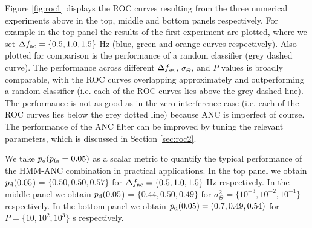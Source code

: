 \documentclass[pra,superscriptaddress,reprint,amsmath,amssymb,nofootinbib]{revtex4-2}
\begin{document}
Figure \ref{fig:roc1} displays the ROC curves resulting from the three numerical experiments above in the top, middle and bottom panels respectively. For example in the top panel the results of the first experiment are plotted, where we set  $\Delta f_{\rm ac} = \{0.5, 1.0, 1.5\}$ Hz (blue, green and orange curves respectively). Also plotted for comparison is the performance of a random classifier (grey dashed curve). The performance across different $\Delta f_{\rm ac}$, $\sigma_\Theta$, and $P$ values is broadly comparable, with the ROC curves overlapping approximately and outperforming a random classifier (i.e. each of the ROC curves lies above the grey dashed line). The performance is not as good as in the zero interference case (i.e. each of the ROC curves lies below the grey dotted line) because ANC is imperfect of course. The performance of the ANC filter can be improved by tuning the relevant parameters, which is discussed in Section \ref{sec:roc2}. \newline 


We take $p_{d}(p_{\rm fa} =0.05)$ as a scalar metric to quantify the typical performance of the HMM-ANC combination in practical applications. In the top panel we obtain $p_{\rm d}(0.05$) = $ \{0.50, 0.50, 0.57 \}$ for $\Delta f_{\rm ac} =  \{0.5, 1.0, 1.5\}$ Hz respectively. In the middle panel we obtain $p_{\rm d}(0.05$) = $ \{0.44,0.50,0.49 \}$ for $\sigma_{\Theta}^2 =  \{ 10^{-3}, 10^{-2}, 10^{-1}\}$ respectively. In the bottom panel we obtain $p_{\rm d}(0.05) = (0.7,0.49,0.54)$ for $P=  \{ 10, 10^2, 10^3\}$ s respectively.
\end{document}
